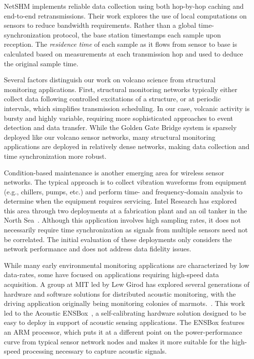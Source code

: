 NetSHM implements reliable data collection using both hop-by-hop caching and
end-to-end retransmissions. Their work explores the use of local computations
on sensors to reduce bandwidth requirements. Rather than a global
time-synchronization protocol, the base station timestamps each sample upon
reception. The \textit{residence time} of each sample as it flows from sensor
to base is calculated based on measurements at each transmission hop and used
to deduce the original sample time.

Several factors distinguish our work on volcano science from structural
monitoring applications. First, structural monitoring networks typically
either collect data following controlled excitations of a structure, or at
periodic intervals, which simplifies transmission scheduling. In our case,
volcanic activity is bursty and highly variable, requiring more sophisticated
approaches to event detection and data transfer. While the Golden Gate Bridge
system is sparsely deployed like our volcano sensor networks, many structural
monitoring applications are deployed in relatively dense networks, making
data collection and time synchronization more robust. 

Condition-based maintenance is another emerging area for wireless sensor
networks. The typical approach is to collect vibration waveforms from
equipment (e.g., chillers, pumps, etc.) and perform time- and
frequency-domain analysis to determine when the equipment requires servicing.
Intel Research has explored this area through two deployments at a
fabrication plant and an oil tanker in the North
Sea~\cite{intel-northseasensys}. Although this application involves high
sampling rates, it does not necessarily require time synchronization as
signals from multiple sensors need not be correlated. The initial evaluation
of these deployments only considers the network performance and does not
address data fidelity issues.

While many early environmental monitoring applications are characterized by
low data-rates, some have focused on applications requiring high-speed data
acquisition. A group at MIT led by Lew Girod has explored several generations
of hardware and software solutions for distributed acoustic monitoring, with
the driving application originally being monitoring colonies of
marmots.~\cite{girod-marmots}. This work led to the Acoustic
ENSBox~\cite{girod-ensbox}, a self-calibrating hardware solution designed to
be easy to deploy in support of acoustic sensing applications. The ENSBox
features an ARM processor, which puts it at a different point on the
power-performance curve from typical sensor network nodes and makes it more
suitable for the high-speed processing necessary to capture acoustic signals.

